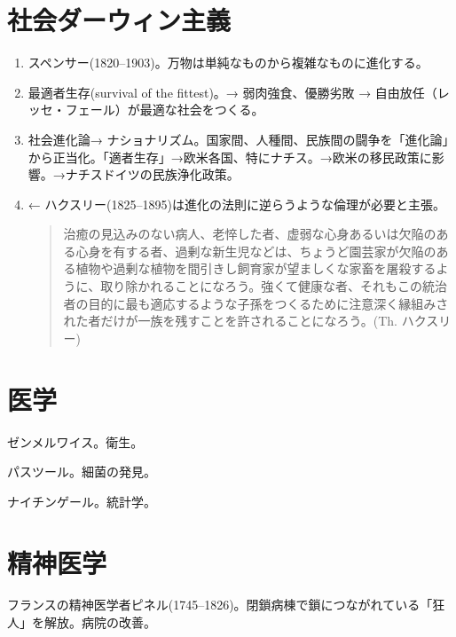 \documentclass[uplatex,dvipdfmx]{jsarticle}
\begin{document}
\section{社会ダーウィン主義}

\begin{enumerate}
\item スペンサー(1820--1903)。万物は単純なものから複雑なものに進化する。
\item 最適者生存(survival of the fittest)。→ 弱肉強食、優勝劣敗 → 自由放任（レッセ・フェール）が最適な社会をつくる。

\item 社会進化論→ ナショナリズム。国家間、人種間、民族間の闘争を「進化論」から正当化。「適者生存」→欧米各国、特にナチス。→欧米の移民政策に影響。→ナチスドイツの民族浄化政策。

\item ← ハクスリー(1825--1895)は進化の法則に逆らうような倫理が必要と主張。
\begin{quote}
  治癒の見込みのない病人、老悴した者、虚弱な心身あるいは欠陥のある心身を有する者、過剰な新生児などは、ちょうど園芸家が欠陥のある植物や過剰な植物を間引きし飼育家が望ましくな家畜を屠殺するように、取り除かれることになろう。強くて健康な者、それもこの統治者の目的に最も適応するような子孫をつくるために注意深く縁組みされた者だけが一族を残すことを許されることになろう。(Th. ハクスリー)
\end{quote}

\end{enumerate}

\nocite{市野川容孝12:社会学}





\section{医学}



ゼンメルワイス。衛生。

パスツール。細菌の発見。

ナイチンゲール。統計学。


\section{精神医学}



フランスの精神医学者ピネル(1745--1826)。閉鎖病棟で鎖につながれている「狂人」を解放。病院の改善。
\end{document}
